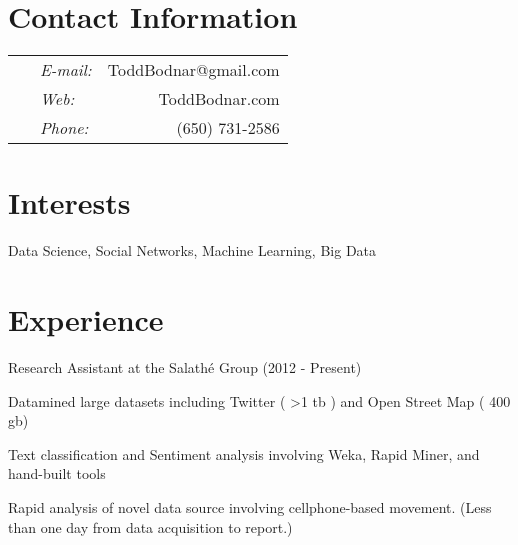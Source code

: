 \documentclass[margin,line]{res}
\newenvironment{list1}{
  \begin{list}{\ding{113}}{%
      \setlength{\itemsep}{0in}
      \setlength{\parsep}{0in} \setlength{\parskip}{0in}
      \setlength{\topsep}{0in} \setlength{\partopsep}{0in} 
      \setlength{\leftmargin}{0.17in}}}{\end{list}}
\begin{document}

\begin{resume}
\section{\sc Contact Information}
\vspace{.05in}
\begin{tabular}{@{}p{3.7in}p{.5in} r }
\   &  {\it E-mail:}  & ToddBodnar@gmail.com \\         
\   &  {\it Web:}  & ToddBodnar.com \\
\  & {\it Phone:} & (650) 731-2586 \\
\end{tabular}


\section{\sc Interests}
Data Science, Social Networks, Machine Learning, Big Data
\ \\



\section{\sc  Experience}
Research Assistant at the Salath\'e Group (2012 - Present)
\begin{list1}
\item[] Datamined large datasets including Twitter  ( \textgreater 1 tb ) and Open Street Map ( 400 gb)
\item[] Text classification and Sentiment analysis involving Weka, Rapid Miner, and hand-built tools
\item[] Rapid analysis of novel data source involving cellphone-based movement. (Less than one day from data acquisition to report.)
\end{list1}


\end{resume}
\end{document}
